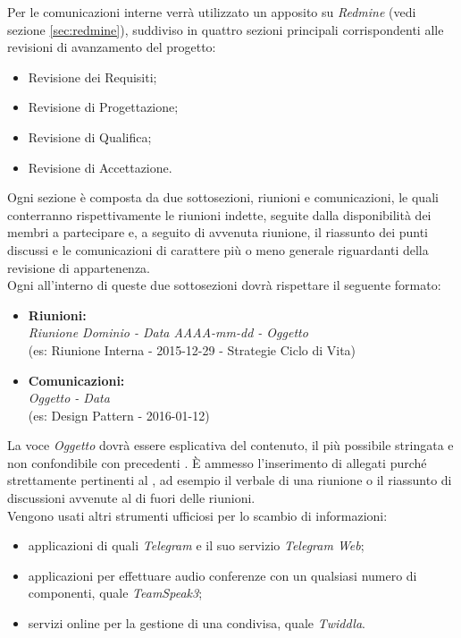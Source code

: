 \documentclass{scalatekids-article}
\begin{document}
\label{sec:ComunicazioniInterne}
Per le comunicazioni interne verrà utilizzato un  apposito su
\textit{Redmine} (vedi sezione \ref{sec:redmine}), suddiviso in quattro sezioni
principali corrispondenti alle revisioni di avanzamento del progetto:
\begin{itemize}
    \item Revisione dei Requisiti;
    \item Revisione di Progettazione;
    \item Revisione di Qualifica;
    \item Revisione di Accettazione.
\end{itemize}
Ogni sezione è composta da due sottosezioni, riunioni e comunicazioni, le quali
conterranno rispettivamente le riunioni indette, seguite dalla disponibilità dei
membri a partecipare e, a seguito di avvenuta riunione, il riassunto dei punti
discussi e le comunicazioni di carattere più o meno generale riguardanti
 della revisione di appartenenza.\\ Ogni  all'interno di
queste due sottosezioni dovrà rispettare il seguente formato:
\begin{itemize}
    \item\textbf{Riunioni:}\\
        \textit{Riunione Dominio - Data AAAA-mm-dd - Oggetto}\\
        (es: Riunione Interna - 2015-12-29 - Strategie Ciclo di Vita)
    \item\textbf{Comunicazioni:}\\
        \textit{Oggetto - Data}\\
        (es: Design Pattern - 2016-01-12)
\end{itemize}
La voce \textit{Oggetto} dovrà essere esplicativa del contenuto, il più
possibile stringata e non confondibile con precedenti . È ammesso
l'inserimento di allegati purché strettamente pertinenti al , ad
esempio il verbale di una riunione o il riassunto di discussioni avvenute al di
fuori delle riunioni.\\ Vengono usati altri strumenti ufficiosi per lo scambio
di informazioni:
\begin{itemize}
    \item applicazioni di  quali \textit{Telegram} e il suo servizio \textit{Telegram Web};
    \item applicazioni  per effettuare audio conferenze con un qualsiasi numero di componenti, quale \textit{TeamSpeak3};
    \item servizi online per la gestione di una  condivisa, quale \textit{Twiddla}.
\end{itemize}
\end{document}
